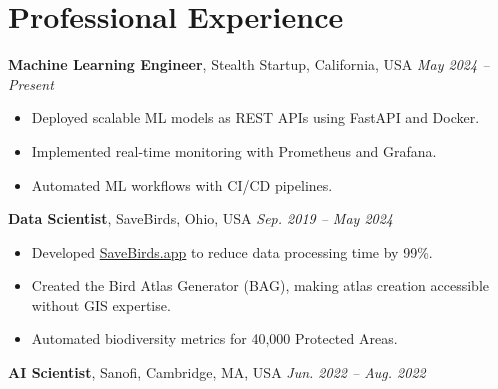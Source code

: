 \documentclass[a4paper,10pt]{article}
\begin{document}
\section*{Professional Experience}

\vspace{6pt}
\hspace{3mm} {\bfseries Machine Learning Engineer}, Stealth Startup, California, USA \hfill \textit{May 2024 -- Present}

\begin{itemize}

    \item Deployed scalable ML models as REST APIs using FastAPI and Docker.
    
    \item Implemented real-time monitoring with Prometheus and Grafana.
    
    \item Automated ML workflows with CI/CD pipelines.

\end{itemize}

\vspace{6pt}
\hspace{3mm} {\bfseries Data Scientist}, SaveBirds, Ohio, USA \hfill \textit{Sep. 2019 -- May 2024}

\begin{itemize}

    \item Developed \href{http://www.savebirds.app}{SaveBirds.app} to reduce data processing time by 99\%.
    
    \item Created the Bird Atlas Generator (BAG), making atlas creation accessible without GIS expertise.
    
    \item Automated biodiversity metrics for 40,000 Protected Areas.

\end{itemize}

\vspace{6pt}
\hspace{3mm} {\bfseries AI Scientist}, Sanofi, Cambridge, MA, USA \hfill \textit{Jun. 2022 -- Aug. 2022}
\end{document}

